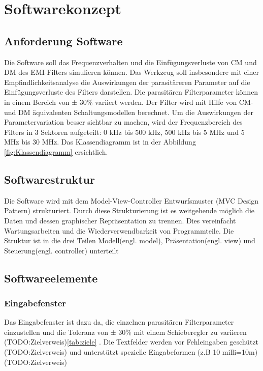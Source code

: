 \section{Softwarekonzept} \label{sec:softwarekonzept}

\subsection{Anforderung Software} \label{subsec:anforderungSoftware}

Die Software soll das Frequenzverhalten und die Einfügungsverluste von CM und DM des EMI-Filters simulieren können. Das Werkzeug soll insbesondere mit einer Empfindlichkeitsanalyse die Auswirkungen der parasitäreren Parameter auf die Einfügungsverluste des Filters darstellen. Die parasitären Filterparameter können in einem Bereich von ± 30\% variiert werden. Der Filter wird mit Hilfe von CM- und DM äquivalenten Schaltungsmodellen berechnet. Um die Auswirkungen der Parametervariation besser sichtbar zu machen, wird der Frequenzbereich des Filters in 3 Sektoren aufgeteilt: 0 kHz bis 500 kHz, 500 kHz bis 5 MHz und 5 MHz bis 30 MHz. Das Klassendiagramm ist in der Abbildung \ref{fig:Klassendiagramm} ersichtlich.

\subsection{Softwarestruktur} \label{subsec:softwarestruktur}

Die Software wird mit dem Model-View-Controller Entwurfsmuster (MVC Design Pattern) \cite{MVCDesignPattern} strukturiert. Durch diese Strukturierung ist es weitgehende möglich die Daten und dessen graphischer Repräsentation zu trennen. Dies vereinfacht Wartungsarbeiten und die Wiederverwendbarkeit von Programmteile. Die Struktur ist in die drei Teilen Modell(engl. model), Präsentation(engl. view) und Steuerung(engl. controller) unterteilt

\subsection{Softwareelemente} \label{subsec:softwareelemente}

\subsubsection{Eingabefenster} \label{subsubsec:eingabefenster}

Das Eingabefenster ist dazu da, die einzelnen parasitären Filterparameter einzustellen und die Toleranz von ± 30\% mit einem Schieberegler zu variieren (TODO:Zielverweis)\ref{tab:ziele} . Die  Textfelder werden vor Fehleingaben geschützt (TODO:Zielverweis) und unterstützt spezielle Eingabeformen (z.B 10 milli=10m) (TODO:Zielverweis)

